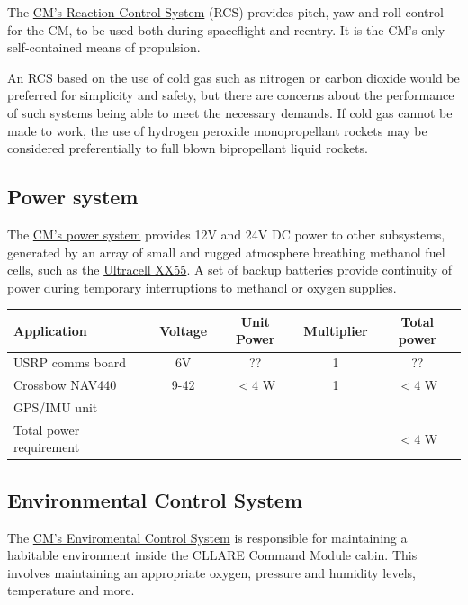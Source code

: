 \documentclass{report}
\begin{document}
The \href{http://cstart.org/wiki/CLLARE_CM_Reaction_Control_System}{CM's Reaction Control System} (RCS) provides pitch, yaw and roll control for the CM, to be used both during spaceflight and reentry. It is the CM's only self-contained means of propulsion.

An RCS based on the use of cold gas such as nitrogen or carbon dioxide would be preferred for simplicity and safety, but there are concerns about the performance of such systems being able to meet the necessary demands.  If cold gas cannot be made to work, the use of hydrogen peroxide monopropellant rockets may be considered preferentially to full blown bipropellant liquid rockets.

\subsection{Power system}

The \href{http://cstart.org/wiki/CLLARE_CM_Power_System}{CM's power system} provides 12V and 24V DC power to other subsystems, generated by an array of small and rugged atmosphere breathing methanol fuel cells, such as the \href{http://www.ultracellpower.com/assets/XX55_Data_Sheet_01-27-2009.pdf}{Ultracell XX55}.  A set of backup batteries provide continuity of power during temporary interruptions to methanol or oxygen supplies.

\begin{tabular}{ | l | c | c | c | c | }
\hline
Application & Voltage & Unit Power & Multiplier & Total power \\
\hline
\hline
USRP comms board & 6V & ?? & 1 & ?? \\
\hline
Crossbow NAV440 & 9-42 & $<4$ W & 1 & $<4$ W \\
GPS/IMU unit & & & & \\
\hline
\hline
Total power requirement & & & & $<4$ W \\
\hline
\end{tabular}

\subsection{Environmental Control System}

The \href{http://cstart.org/wiki/CLLARE_Environmental_Control_System}{CM's Enviromental Control System} is responsible for maintaining a habitable environment inside the CLLARE Command Module cabin. This involves maintaining an appropriate oxygen, pressure and humidity levels, temperature and more.
\end{document}
